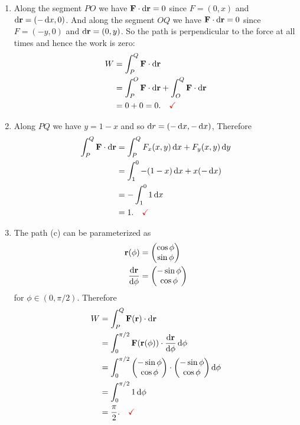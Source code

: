 \begin{enumerate}[label=(\alph*)]
\item Along the segment $PO$ we have $\F \cdot \d\r = 0$ since $F = (0, x)$ and $\d\r = (-\dx,
  0)$. And along the segment $OQ$ we have $\F \cdot \d\r = 0$ since $F = (-y, 0)$ and
  $\d\r = (0, y)$. So the path is perpendicular to the force at all times and hence the work is
  zero:
  \begin{align*}
    W
    &= \int_P^Q \F \cdot \d\r \\
    &= \int_P^O \F \cdot \d\r + \int_O^Q \F \cdot \d\r \\
    &= 0 + 0 = 0. ~~~\red{\checkmark}
  \end{align*}
\item Along $PQ$ we have $y = 1 - x$ and so $\dr = (-\dx, -\dx)$, Therefore
  \begin{align*}
    \int_P^Q \F \cdot \d\r
    &= \int_P^Q F_x(x, y)\dx + F_y(x, y)\dy \\
    &= \int_1^0 -(1-x)\dx + x(-\dx) \\
    &= -\int_1^0 1 \dx \\
    &= 1. ~~~\red{\checkmark}
  \end{align*}
\item The path (c) can be parameterized as
  \begin{align*}
    \r(\phi)            &= \vecMM{\cos \phi}{\sin \phi} \\
    \frac{\d\r}{\d\phi} &= \vecMM{-\sin\phi}{\cos\phi}
  \end{align*}
  for $\phi \in (0, \pi/2)$. Therefore
  \begin{align*}
    W
    &= \int_P^Q \F(\r) \cdot \d\r \\
    &= \int_0^{\pi/2} \F(\r(\phi)) \cdot \frac{\d\r}{\d\phi} \d\phi \\
    &= \int_0^{\pi/2} \vecMM{-\sin\phi}{\cos\phi} \cdot \vecMM{-\sin\phi}{\cos\phi} \d\phi \\
    &= \int_0^{\pi/2} 1 \d\phi \\
    &= \frac{\pi}{2}. ~~~\red{\checkmark}
  \end{align*}

\end{enumerate}
  %
